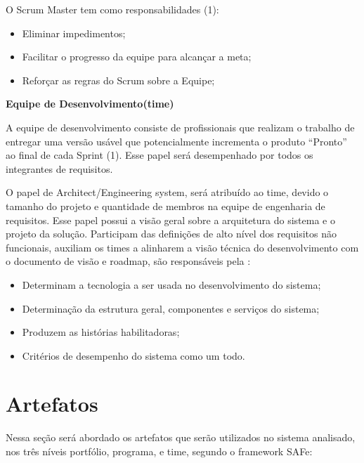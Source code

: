 \begin{description}
O Scrum Master tem como responsabilidades (1):
\begin{itemize}
    \item Eliminar impedimentos;
    \item Facilitar o progresso da equipe para alcançar a meta;
    \item Reforçar as regras do Scrum sobre a Equipe;
\end{itemize}

\item \textbf{Equipe de Desenvolvimento(time)}

A equipe de desenvolvimento consiste de profissionais que realizam o trabalho de entregar uma versão usável que potencialmente incrementa o produto “Pronto” ao final de cada Sprint (1). Esse papel será desempenhado por todos os integrantes de requisitos.

O papel de Architect/Engineering system, será atribuído ao time, devido o tamanho do projeto e quantidade de membros na equipe de engenharia de requisitos. Esse papel possui a visão geral sobre a arquitetura do sistema e o projeto da solução. Participam das definições de alto nível dos requisitos não funcionais, auxiliam os times a alinharem a visão técnica do desenvolvimento com o documento de visão e roadmap, são responsáveis pela \cite{safe}:
\begin{itemize}
    \item Determinam a tecnologia a ser usada no desenvolvimento do sistema;
    \item Determinação da estrutura geral, componentes e serviços do sistema;
    \item Produzem as histórias habilitadoras;
    \item Critérios de desempenho do sistema como um todo.
\end{itemize}
\end{description}
\section{Artefatos}

Nessa seção será abordado os artefatos que serão utilizados no sistema analisado, nos três níveis portfólio, programa, e time, segundo o framework SAFe:

